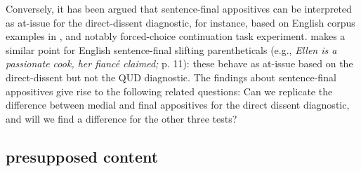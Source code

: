 \documentclass[times,linguex,xcolor]{glossa}
\begin{document}
  Conversely, it has been argued that sentence-final appositives can be interpreted as at-issue for the direct-dissent diagnostic, for instance, based on English corpus examples in \citealt{anderbois_at-issue_2015}, and notably  forced-choice continuation task experiment. \citealt{koev_notions_2018} makes a similar point for English sentence-final slifting parentheticals (e.g., \emph{Ellen is a passionate cook, her fiancé claimed;} p. 11): these behave as at-issue based on the direct-dissent but not the QUD diagnostic. The findings about sentence-final appositives give rise to the following related questions: Can we replicate the difference between medial and final appositives for the direct dissent diagnostic, and will we find a difference for the other three tests?



  \subsection{presupposed content}
\end{document}
